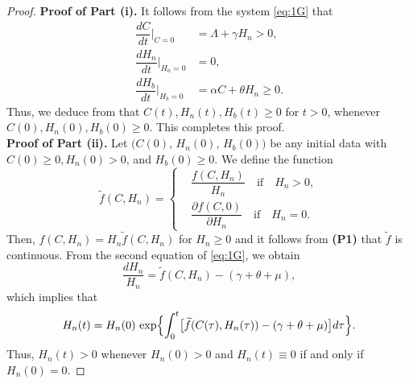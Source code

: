 \documentclass[11pt]{article}
\theoremstyle{definition}
\theoremstyle{remark}
\numberwithin{equation}{section}
\begin{document}
\begin{proof}
\textbf{Proof of Part (i).} It follows from the system \eqref{eq:1G} that
\begin{equation*}
\begin{split}
 \dfrac{dC}{dt}\bigg|_{C = 0} &= \Lambda + \gamma H_n > 0,\\
 \dfrac{dH_n}{dt}\bigg|_{H_n = 0} &= 0,\\
 \dfrac{d H_b}{dt}\bigg|_{H_b = 0} &= \alpha C + \theta H_n \ge0.
\end{split}
\end{equation*}
Thus, we deduce from \cite[Proposition B.7]{Smith} that $C(t), H_n(t), H_b(t) \ge0$ for $t>0$, whenever $C(0), H_n(0), H_b(0) \ge0$. 
This completes this proof.\\
\textbf{Proof of Part (ii).} 
Let $\big(C(0),\,H_n(0),\,H_b(0)\big)$ be any initial data with $C(0) \ge0, H_n(0) > 0$, and $H_b(0) \ge0$.
We define the function
\begin{equation*}\label{eq:7}
\widetilde{f}(C, H_n) =
\begin{cases}
  &\dfrac{f(C, H_n)}{H_n} \quad  \text{if} \quad H_n > 0,\\[10pt]
  &\dfrac{\partial f(C, 0)}{\partial H_n} \quad \text{if} \quad H_n = 0.
\end{cases}
\end{equation*}
Then, $f(C, H_n) = H_n \widetilde{f}(C, H_n)$ for $H_n\ge0$ and it follows from \textbf{(P1)} that $\widetilde{f}$ is continuous. 
From the second equation of \eqref{eq:1G}, we obtain
\begin{equation*}
   \dfrac{dH_n}{H_n} = \widetilde{f}(C, H_n) - (\gamma + \theta + \mu),
\end{equation*}
which implies that
\begin{equation*}
    H_n(t) = H_n(0)\,
    \exp\Bigl\{\int_0^t\bigl[\widetilde{f}(C(\tau), H_n(\tau)) - (\gamma + \theta + \mu)\bigr]d\tau\Bigr\}.
\end{equation*}
Thus, $H_n(t)>0$ whenever $H_n(0)>0$ and $H_n(t)\equiv0$ if and only if $H_n(0)=0$.


\end{proof}
\end{document}
